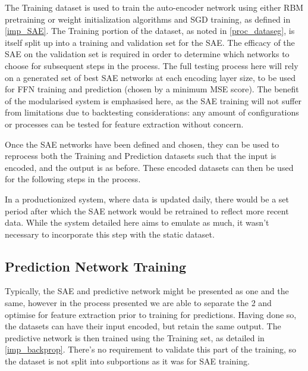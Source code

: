 \documentclass[a4paper,11pt,oneside]{article}
\theoremstyle{plain}
\theoremstyle{definition}
\begin{document}
The Training dataset is used to train the auto-encoder network using either RBM pretraining or weight initialization algorithms and SGD training, as defined in \ref{imp_SAE}. The Training portion of the dataset, as noted in \ref{proc_dataseg}, is itself split up into a training and validation set for the SAE. The efficacy of the SAE on the validation set is required in order to determine which networks to choose for subsequent steps in the process. The full testing process here will rely on a generated set of best SAE networks at each encoding layer size, to be used for FFN training and prediction (chosen by a minimum MSE score). The benefit of the modularised system is emphasised here, as the SAE training will not suffer from limitations due to backtesting considerations: any amount of configurations or processes can be tested for feature extraction without concern. \newline

Once the SAE networks have been defined and chosen, they can be used to reprocess both the Training and Prediction datasets such that the input is encoded, and the output is as before. These encoded datasets can then be used for the following steps in the process. \newline

In a productionized system, where data is updated daily, there would be a set period after which the SAE network would be retrained to reflect more recent data. While the system detailed here aims to emulate as much, it wasn't necessary to incorporate this step with the static dataset. \newline

\subsection{Prediction Network Training}\label{proc_predictionnetwork}

Typically, the SAE and predictive network might be presented as one and the same, however in the process presented we are able to separate the 2 and optimise for feature extraction prior to training for predictions. Having done so, the datasets can have their input encoded, but retain the same output. The predictive network is then trained using the Training set, as detailed in \ref{imp_backprop}. There's no requirement to validate this part of the training, so the dataset is not split into subportions as it was for SAE training. \newline
\end{document}
